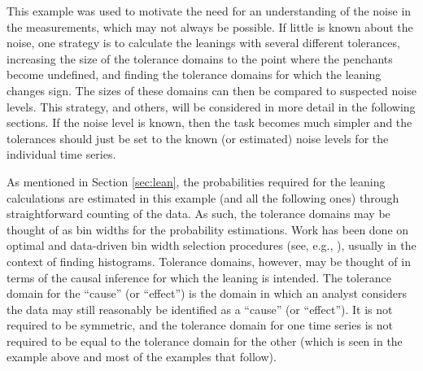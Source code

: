 \documentclass[twocolumn,aps,pre,groupedaddress]{revtex4-1}
\begin{document}
This example was used to motivate the need for an understanding of the noise in the measurements, which may not always be possible.  If little is known about the noise, one strategy is to calculate the leanings with several different tolerances, increasing the size of the tolerance domains to the point where the penchants become undefined, and finding the tolerance domains for which the leaning changes sign.  The sizes of these domains can then be compared to suspected noise levels.  This strategy, and others, will be considered in more detail in the following sections.  If the noise level is known, then the task becomes much simpler and the tolerances should just be set to the known (or estimated) noise levels for the individual time series.

As mentioned in Section \ref{sec:lean}, the probabilities required for the leaning calculations are estimated in this example (and all the following ones) through straightforward counting of the data.  As such, the tolerance domains may be thought of as bin widths for the probability estimations.  Work has been done on optimal and data-driven bin width selection procedures (see, e.g., \cite{Wand1997,Scott1979}), usually in the context of finding histograms.  Tolerance domains, however, may be thought of in terms of the causal inference for which the leaning is intended.  The tolerance domain for the ``cause'' (or ``effect'') is the domain in which an analyst considers the data may still reasonably be identified as a ``cause'' (or ``effect'').  It is not required to be symmetric, and the tolerance domain for one time series is not required to be equal to the tolerance domain for the other (which is seen in the example above and most of the examples that follow).
\end{document}
